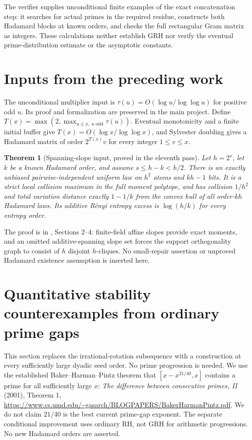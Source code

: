 \documentclass[11pt]{article}
\newtheorem{theorem}{Theorem}[section]
\begin{document}
The verifier supplies unconditional finite examples of the exact
concatenation step: it searches for actual primes in the required
residue, constructs both Hadamard blocks at known orders, and checks
the full rectangular Gram matrix as integers. These calculations
neither establish GRH nor verify the eventual prime-distribution
estimate or the asymptotic constants.

\section*{Inputs from the preceding work}
The unconditional multiplier input is
$\tau(u)=O(\log u/\log\log u)$ for positive odd $u$.
Its proof and formalization are preserved in the main project.
Define $T(x)=\max(2,\max_{u\le x,\ u\text{ odd}}\tau(u))$.
Eventual monotonicity and a finite initial buffer give
$T(x)=O(\log x/\log\log x)$, and Sylvester doubling gives
a Hadamard matrix of order $2^{T(x)}v$ for every integer $1\le v\le x$.

\begin{theorem}[Spanning-slope input, proved in the eleventh pass]
\label{thm:design-spanning-slopes}
Let $h=2^s$, let $k$ be a known Hadamard order, and assume
$s\le h-k<h/2$. There is an exactly unbiased pairwise-independent
uniform law on $h^2$ atoms and $kh-1$ bits. It is a strict local
collision maximum in the full moment polytope, and has collision
$1/h^2$ and total variation distance exactly $1-1/k$ from the convex
hull of all order-$kh$ Hadamard laws. Its additive R\'enyi entropy
excess is $\log(h/k)$ for every entropy order.
\end{theorem}
The proof is in , Sections 2--4:
finite-field affine slopes provide exact moments, and an omitted
additive-spanning slope set forces the support orthogonality graph
to consist of $h$ disjoint $h$-cliques. No small-repair assertion
or unproved Hadamard existence assumption is inserted here.
\section{Quantitative stability counterexamples from ordinary prime gaps}
\label{sec:stability-prime-gaps}
This section replaces the irrational-rotation subsequence with a construction
at every sufficiently large dyadic seed order. No prime progression is
needed. We use the established Baker--Harman--Pintz theorem that
$[x-x^{21/40},x]$ contains a prime for all sufficiently large $x$:
\emph{The difference between consecutive primes, II} (2001), Theorem 1,
\url{https://www.cs.umd.edu/~gasarch/BLOGPAPERS/BakerHarmanPintz.pdf}.
We do not claim $21/40$ is the best current prime-gap exponent.
The separate conditional improvement uses ordinary RH, not GRH for
arithmetic progressions. No new Hadamard orders are asserted.
\end{document}
